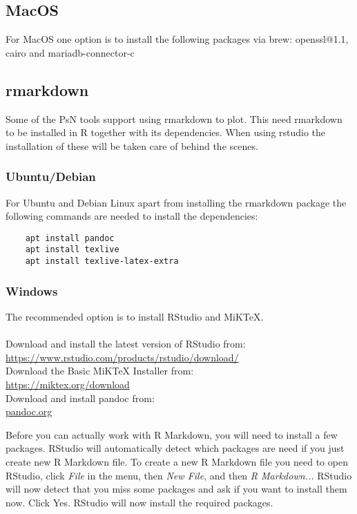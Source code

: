 \subsection{MacOS}
For MacOS one option is to install the following packages via brew: openssl@1.1, cairo and mariadb-connector-c


\subsection{rmarkdown}

Some of the PsN tools support using rmarkdown to plot. This need rmarkdown to be installed in R together with its dependencies. When using rstudio the installation of these will be taken care of behind the scenes.

\subsubsection{Ubuntu/Debian}

For Ubuntu and Debian Linux apart from installing the rmarkdown package the following commands are needed to install the dependencies:

\begin{verbatim}
    apt install pandoc
    apt install texlive
    apt install texlive-latex-extra
\end{verbatim}

\subsubsection{Windows}

The recommended option is to install RStudio and MiKTeX.\\ \\
Download and install the latest version of RStudio from: \\
\url{https://www.rstudio.com/products/rstudio/download/} \\
Download the Basic MiKTeX Installer from: \\
\url{https://miktex.org/download} \\
Download and install pandoc from: \\
\url{pandoc.org}

Before you can actually work with R Markdown, you will need to install a few packages. RStudio will automatically detect which packages are need if you just create new R Markdown file. To create a new R Markdown file you need to open RStudio, click {\it File} in the menu, then {\it New File}, and then {\it R Markdown...} RStudio will now detect that you miss some packages and ask if you want to install them now. Click Yes. RStudio will now install the required packages.


